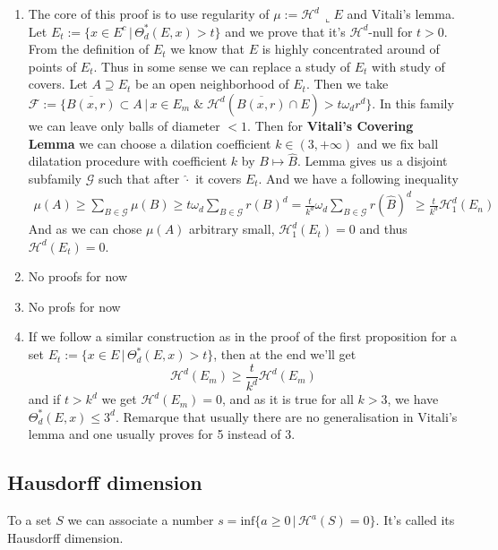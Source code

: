 \vspace{1ex}
\begin{enumerate}
    \item The core of this proof is to use regularity of $\mu:=\mathcal H^d\,
        \llcorner E$ and Vitali's lemma. Let $E_t:=\{x\in E^c\,|\,\Theta^*_d(E,x)>t\}$
        and we prove that it's $\mathcal H^d$-null for $t>0$. From the
        definition of $E_t$ we know that $E$ is highly concentrated around of
        points of $E_t$. Thus in some sense we can replace a study of $E_t$ with
        study of covers. Let $A\supseteq E_t$ be an open neighborhood of $E_t$.
        Then we take $\mathcal F:=\{\overline{B(x,r)}\subset A\,|\,x\in E_m\;\&
        \;\mathcal H^d(\overline{B(x,r)}\cap E)>t\omega_dr^d\}$. In this family
        we can leave only balls of diameter $<1$. Then for \textbf{Vitali's
        Covering Lemma} we can choose a dilation coefficient $k\in(3,+\infty)$
        and we fix ball dilatation procedure with coefficient $k$ by $B\mapsto
        \widehat B$. Lemma gives us a disjoint subfamily $\mathcal G$ such that
        after $\widehat\cdot$ it covers $E_t$. And we have a following
        inequality
        \begin{align*}
            \mu(A)\geq\sum_{B\in\mathcal G}\mu(B)\geq t\omega_d\sum_{B\in
            \mathcal G}r(B)^d=\frac{t}{k^d}\omega_d\sum_{B\in\mathcal G}r(
            \widehat B)^d\geq\frac{t}{k^d}\mathcal H^d_1(E_n)
        \end{align*}
        And as we can chose $\mu(A)$ arbitrary small, $\mathcal H^d_1(E_t)=0$ and thus
        $\mathcal H^d(E_t)=0$.
    \item No proofs for now
    \item No profs for now
    \item If we follow a similar construction as in the proof of the first
        proposition for a set $E_t:=\{x\in E\,|\,\Theta^*_d(E,x)>t\}$, then
        at the end we'll get
        \[\mathcal H^d(E_m)\geq\frac{t}{k^d}\mathcal H^d(E_m)\]
        and if $t>k^d$ we get $\mathcal H^d(E_m)=0$, and as it is true for all
        $k>3$, we have $\Theta^*_d(E,x)\leq3^d$. Remarque that usually there
        are no generalisation in Vitali's lemma and one usually proves for 5
        instead of 3.
\end{enumerate}

\subsection{Hausdorff dimension}
To a set $S$ we can associate a number $s=\text{inf}\{a\geq 0\,|\,\mathcal{H}^a
(S)=0\}$. It's called its Hausdorff dimension.

